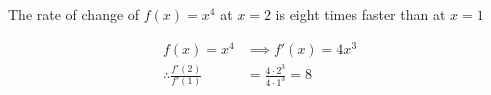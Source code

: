 \documentclass[14pt,fleqn]{extarticle}
\begin{document}
 
\begin{snippet}
    \correct
    
    The rate of change of $f(x) = x^4$ at $x = 2$ is eight times faster than at $x=1$ 
    
    \reason
    
    \begin{align}
	f(x) = x^4 &\implies f'(x) = 4x^3 \\
	\therefore \frac{f'(2)}{f'(1)} &= \frac{4\cdot 2^3}{4\cdot 1^3} = 8 
\end{align}
    
\end{snippet} 
\end{document}
